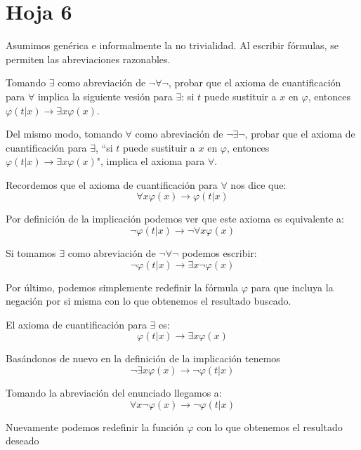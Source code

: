 \section{Hoja 6}

Asumimos gen\'erica e informalmente la no trivialidad. Al escribir f\'ormulas, se permiten
las abreviaciones razonables.

\begin{problem}
\ppart
Tomando $\exists$ como abreviaci\'on de $\neg \forall \neg$, probar que el axioma de cuantificaci\'on para $\forall$
implica la siguiente vesi\'on para $\exists$:  si $t$ puede sustituir a $x$ en $\varphi$, entonces $\varphi (t|x) \to \exists x \varphi(x)  $.

\ppart Del mismo modo, tomando $\forall$  como abreviaci\'on de $\neg \exists\neg$, probar que el axioma de cuantificaci\'on para $\exists$,
``si $t$ puede sustituir a $x$ en $\varphi$, entonces $\varphi (t|x) \to \exists x \varphi(x)  $", implica el axioma para $\forall$.
\solution


\spart

Recordemos que el axioma de cuantificación para $\forall$ nos dice que:
\[\forall x \varphi(x) \to \varphi(t|x)\]

Por definición de la implicación podemos ver que este axioma es equivalente a:
\[\neg \varphi(t|x) \to \neg \forall x \varphi(x)\]

Si tomamos $\exists$ como abreviación de $\neg \forall \neg$ podemos escribir:
\[\neg \varphi(t|x) \to \exists x \neg \varphi(x)\]

Por último, podemos simplemente redefinir la fórmula $\varphi$ para que incluya la negación por si misma con lo que obtenemos el resultado buscado.

\spart

El axioma de cuantificación para $\exists$ es:
\[\varphi(t|x) \to \exists x \varphi(x)\]

Basándonos de nuevo en la definición de la implicación tenemos
\[\neg \exists x \varphi(x) \to \neg \varphi(t|x)\]

Tomando la abreviación del enunciado llegamos a:
\[\forall x \neg \varphi(x) \to \neg \varphi(t|x)\]

Nuevamente podemos redefinir la función $\varphi$ con lo que obtenemos el resultado deseado
\end{problem}

